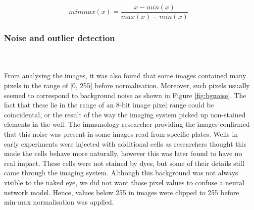 \begin{equation}
    minmax(x) = \frac{x - min(x)}{max(x) - min(x)}
\label{equation:minmax}
\end{equation} 

\bigskip
\subsubsection{Noise and outlier detection}

\hfill\\
\hfill\\
From analysing the images, it was also found that some images contained many pixels in the range of [0, 255] before normalisation. Moreover, such pixels usually seemed to correspond to background noise as shown in Figure \ref{fig:bgnoise}. The fact that these lie in the range of an 8-bit image pixel range could be coincidental, or the result of the way the imaging system picked up non-stained elements in the well. The immunology researcher providing the images confirmed that this noise was present in some images read from specific plates. Wells in early experiments were injected with additional cells as researchers thought this made the cells behave more naturally, however this was later found to have no real impact. These cells were not stained by dyes, but some of their details still came through the imaging system. Although this background was not always visible to the naked eye, we did not want those pixel values to confuse a neural network model. Hence, values below 255 in images were clipped to 255 before min-max normalisation was applied.

